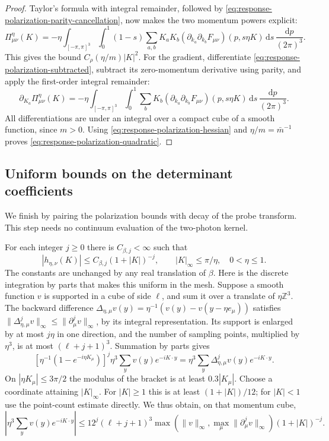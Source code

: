 \documentclass[11pt,letterpaper,reqno]{amsart}
\newcommand{\Z}{\mathbb Z}
\newcommand{\dd}{\mathrm d}
\begin{document}
\begin{proof}
Taylor's formula with integral remainder, followed by
\eqref{eq:response-polarization-parity-cancellation}, now makes
the two momentum powers explicit:
\begin{equation}\label{eq:response-polarization-taylor}
 \Pi^\eta_{\mu\nu}(K)=
   -\eta\int_{[-\pi,\pi]^3}\int_0^1(1-s)
      \sum_{a,b}K_aK_b
       (\partial_{k_a}\partial_{k_b}F_{\mu\nu})(p,s\eta K)
                           \,\dd s\,\frac{\dd p}{(2\pi)^3}.
\end{equation}
This gives the bound $C_\rho(\eta/m)|K|^2$.
For the gradient, differentiate
\eqref{eq:response-polarization-subtracted}, subtract its
zero-momentum derivative using parity, and apply the
first-order integral remainder:
\[
 \partial_{K_a}\Pi^\eta_{\mu\nu}(K)=
  -\eta\int_{[-\pi,\pi]^3}\int_0^1
       \sum_bK_b(\partial_{k_a}\partial_{k_b}F_{\mu\nu})(p,s\eta K)
                              \,\dd s\,\frac{\dd p}{(2\pi)^3}.
\]
All differentiations are under an integral over a compact cube
of a smooth function, since $m>0$. Using
\eqref{eq:response-polarization-hessian} and $\eta/m=\bar m^{-1}$
proves \eqref{eq:response-polarization-quadratic}.
\end{proof}

\subsection{Uniform bounds on the determinant coefficients}
\label{subsec:response-uniform-coefficients}

We finish by pairing the polarization bounds with decay of the
probe transform. This step needs no continuum evaluation of
the two-photon kernel.

For each integer $j\ge0$ there is $C_{\beta,j}<\infty$ such that
\begin{equation}\label{eq:response-midpoint-decay}
 |h_{\eta,\nu}(K)|\le C_{\beta,j}(1+|K|)^{-j},
                \qquad |K|_\infty\le\pi/\eta,\quad0<\eta\le1.
\end{equation}
The constants are unchanged by any real translation of $\beta$.
Here is the discrete integration by parts that makes this
uniform in the mesh. Suppose a smooth function $v$ is supported
in a cube of side $\ell$, and sum it over a translate of $\eta\Z^3$.
The backward difference
$\Delta_{\eta,\mu}v(y)=\eta^{-1}(v(y)-v(y-\eta e_\mu))$
satisfies
$\|\Delta_{\eta,\mu}^jv\|_\infty
\le\|\partial_\mu^jv\|_\infty$, by its integral representation.
Its support is enlarged by at most $j\eta$ in one direction,
and the number of sampling points, multiplied by $\eta^3$,
is at most $(\ell+j+1)^3$. Summation by parts gives
\[
 [\eta^{-1}(1-e^{-i\eta K_\mu})]^j
       \eta^3\sum_yv(y)e^{-iK\cdot y}
          =\eta^3\sum_y\Delta_{\eta,\mu}^jv(y)e^{-iK\cdot y}.
\]
On $|\eta K_\mu|\le3\pi/2$ the modulus of the bracket
is at least $0.3|K_\mu|$. Choose a coordinate attaining
$|K|_\infty$. For $|K|\ge1$ this is at least
$(1+|K|)/12$; for $|K|<1$ use the point-count estimate directly.
We thus obtain, on that momentum cube,
\[
 \left|\eta^3\sum_yv(y)e^{-iK\cdot y}\right|
 \le12^j(\ell+j+1)^3
       \max(\|v\|_\infty,\max_\mu\|\partial_\mu^jv\|_\infty)
                                               (1+|K|)^{-j}.
\]
\end{document}
